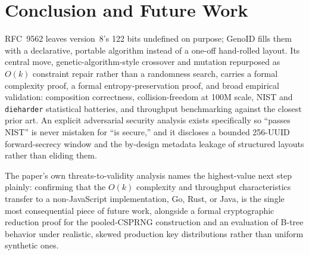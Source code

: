 \documentclass[conference]{IEEEtran}
\begin{document}
\section{Conclusion and Future Work}
RFC~9562 leaves version~8's 122 bits undefined on purpose; GenoID fills them with a declarative, portable algorithm instead of a one-off hand-rolled layout. Its central move, genetic-algorithm-style crossover and mutation repurposed as $O(k)$ constraint repair rather than a randomness search, carries a formal complexity proof, a formal entropy-preservation proof, and broad empirical validation: composition correctness, collision-freedom at 100M scale, NIST and \texttt{dieharder} statistical batteries, and throughput benchmarking against the closest prior art. An explicit adversarial security analysis exists specifically so ``passes NIST'' is never mistaken for ``is secure,'' and it discloses a bounded 256-UUID forward-secrecy window and the by-design metadata leakage of structured layouts rather than eliding them.

The paper's own threats-to-validity analysis names the highest-value next step plainly: confirming that the $O(k)$ complexity and throughput characteristics transfer to a non-JavaScript implementation, Go, Rust, or Java, is the single most consequential piece of future work, alongside a formal cryptographic reduction proof for the pooled-CSPRNG construction and an evaluation of B-tree behavior under realistic, skewed production key distributions rather than uniform synthetic ones.
\end{document}
